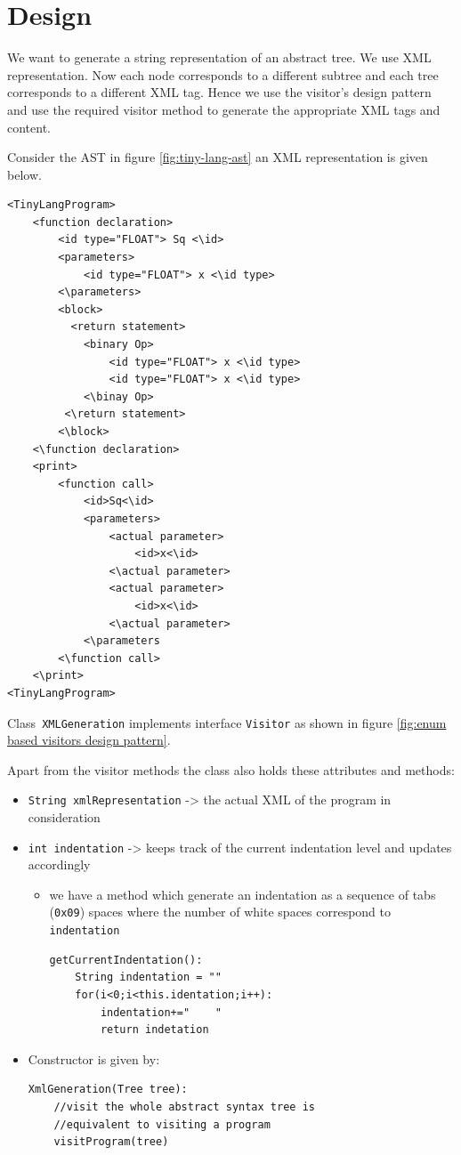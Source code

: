 \section{Design}
\label{sec:design task 3}
We want to generate a string representation of an abstract tree. We use XML representation. Now each node corresponds to a different subtree and each tree corresponds to a different XML tag. Hence we use the visitor's design pattern and use the required visitor method to generate the appropriate XML tags and content.

Consider the AST in figure \ref{fig:tiny-lang-ast} an XML representation is given below.
\begin{lstlisting}[caption=XML representation of AST shown in figure \ref{fig:tiny-lang-ast}]
<TinyLangProgram>
    <function declaration>
        <id type="FLOAT"> Sq <\id>
        <parameters>
            <id type="FLOAT"> x <\id type>
        <\parameters>
        <block>
          <return statement>
            <binary Op>
                <id type="FLOAT"> x <\id type>
                <id type="FLOAT"> x <\id type>
            <\binay Op>
         <\return statement>
        <\block>
    <\function declaration>
    <print>
        <function call>
            <id>Sq<\id>
            <parameters>
                <actual parameter>
                    <id>x<\id>
                <\actual parameter>
                <actual parameter>
                    <id>x<\id>
                <\actual parameter>
            <\parameters
        <\function call>
    <\print>
<TinyLangProgram>
\end{lstlisting}

Class\verb! XMLGeneration! implements interface \verb!Visitor! as shown in figure \ref{fig:enum based visitors design pattern}.


Apart from the visitor methods the class also holds  these attributes and methods:
\begin{itemize}
	\item \verb!String xmlRepresentation! -> the actual XML of the program in consideration
	\item \verb!int indentation! -> keeps track of the current indentation level and updates accordingly
	      \begin{itemize}
	      	\item we have a method which generate an indentation as a sequence of tabs (\verb!0x09!) spaces where the number of white spaces correspond to \verb!indentation! 
	      	      \begin{lstlisting}[caption=Get current indentation]
getCurrentIndentation():
    String indentation = ""
    for(i<0;i<this.identation;i++):
        indentation+="    "
        return indetation
	      	      \end{lstlisting}
	      \end{itemize}
	\item Constructor is given by:
	      \begin{lstlisting}[caption=XmlGeneration Constructor]
XmlGeneration(Tree tree):
    //visit the whole abstract syntax tree is 
    //equivalent to visiting a program
    visitProgram(tree)
	      \end{lstlisting}
\end{itemize}
